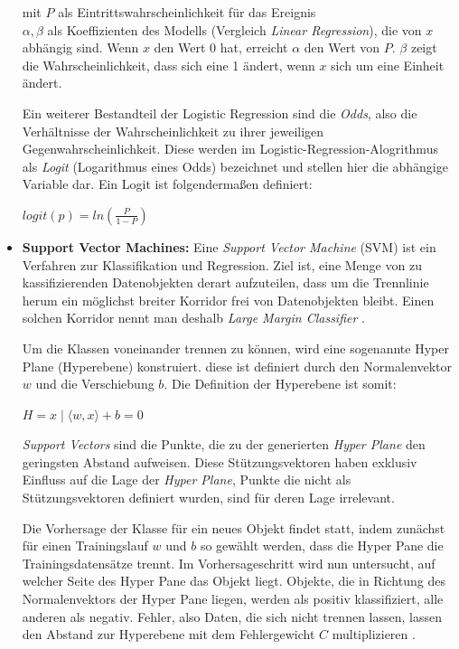 \begin{itemize}
mit \(P\) als Eintrittswahrscheinlichkeit für das Ereignis \\
\(\alpha, \beta\) als Koeffizienten des Modells (Vergleich \textit{Linear Regression}), die von \(x\) abhängig sind. Wenn \(x\) den Wert 0 hat, erreicht \(\alpha\) den Wert von \(P\). \(\beta\) zeigt die Wahrscheinlichkeit, dass sich eine 1 ändert, wenn \(x\) sich um eine Einheit ändert.

Ein weiterer Bestandteil der Logistic Regression sind die \textit{Odds}, also die Verhältnisse der Wahrscheinlichkeit zu ihrer jeweiligen Gegenwahrscheinlichkeit. Diese werden im Logistic-Regression-Alogrithmus als \textit{Logit} (Logarithmus eines Odds) bezeichnet und stellen hier die abhängige Variable dar. 
Ein Logit ist folgendermaßen definiert: 

\(logit(p) = ln( \frac{P}{1-P})\)

\item \textbf{Support Vector Machines:} Eine \textit{Support Vector Machine} (SVM) ist ein Verfahren zur Klassifikation und Regression. Ziel ist, eine Menge von zu kassifizierenden Datenobjekten derart aufzuteilen, dass um die Trennlinie herum ein möglichst breiter Korridor frei von Datenobjekten bleibt. Einen solchen Korridor nennt man deshalb \textit{Large Margin Classifier} .

Um die Klassen voneinander trennen zu können, wird eine sogenannte Hyper Plane (Hyperebene) konstruiert. diese ist definiert durch den Normalenvektor \(w\) und die Verschiebung \(b\). Die Definition der Hyperebene ist somit: 

\(H = {x \mid \langle w,x \rangle+b=0}\)

\textit{Support Vectors} sind die Punkte, die zu der generierten \textit{Hyper Plane} den geringsten Abstand aufweisen. Diese Stützungsvektoren haben exklusiv Einfluss auf die Lage der \textit{Hyper Plane}, Punkte die nicht als Stützungsvektoren definiert wurden, sind für deren Lage irrelevant.  

Die Vorhersage der Klasse für ein neues Objekt findet statt, indem zunächst für einen Trainingslauf \(w\) und \(b\) so gewählt werden, dass die Hyper Pane die Trainingsdatensätze trennt. Im Vorhersageschritt wird nun untersucht, auf welcher Seite des Hyper Pane das Objekt liegt. Objekte, die in Richtung des Normalenvektors der Hyper Pane liegen, werden als positiv klassifiziert, alle anderen als negativ. Fehler, also Daten, die sich nicht trennen lassen, lassen den Abstand zur Hyperebene mit dem Fehlergewicht \(C\) multiplizieren .  


\end{itemize}
